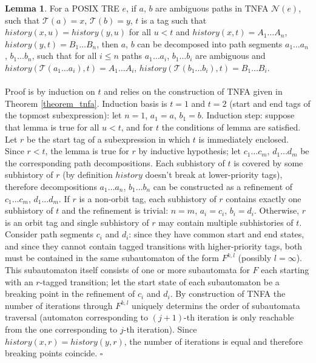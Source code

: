 \documentclass{article}
\newcommand{\Xeq}{\!=\!}
\newcommand{\XN}{\mathcal{N}}
\newcommand{\XT}{\mathcal{T}}
\theoremstyle{definition}
\newtheorem{XLem}{Lemma}
\begin{document}
\begin{multicols}{2}
\begin{XLem}\label{lemma_path_decomposition}
For a POSIX TRE $e$,
if $a$, $b$ are ambiguous paths in TNFA $\XN(e)$, such that $\XT(a) \Xeq x$, $\XT(b) \Xeq y$,
$t$ is a tag such that $history(x, u) \Xeq history(y, u)$ for all $u \!<\! t$
and $history(x, t) \Xeq A_1 \dots A_n$, $history(y, t) \Xeq B_1 \dots B_n$,
then $a$, $b$ can be decomposed into path segments $a_1 \dots a_n$, $b_1 \dots b_n$,
such that for all $i \!\leq\! n$ paths $a_1 \dots a_i$, $b_1 \dots b_i$ are ambiguous
and $history(\XT(a_1 \dots a_i), t) \Xeq A_1 \dots A_i$, $history(\XT(b_1 \dots b_i), t) \Xeq B_1 \dots B_i$.
\\
\\
Proof is by induction on $t$ and relies on the construction of TNFA given in Theorem \ref{theorem_tnfa}.
Induction basis is $t \Xeq 1$ and $t \Xeq 2$ (start and end tags of the topmost subexpression): let $n \Xeq 1$, $a_1 \Xeq a$, $b_1 \Xeq b$.
Induction step: suppose that lemma is true for all $u \!<\! t$,
and for $t$ the conditions of lemma are satisfied.
Let $r$ be the start tag of a subexpression in which $t$ is immediately enclosed.
Since $r \!<\! t$, the lemma is true for $r$ by inductive hypothesis;
let $c_1 \dots c_m$, $d_1 \dots d_m$ be the corresponding path decompositions.
Each subhistory of $t$ is covered by some subhistory of $r$ (by definition $history$ doesn't break at lower-priority tags),
therefore decompositions $a_1 \dots a_n$, $b_1 \dots b_n$ can be constructed as a refinement of $c_1 \dots c_m$, $d_1 \dots d_m$.
If $r$ is a non-orbit tag, each subhistory of $r$ contains exactly one subhistory of $t$
and the refinement is trivial: $n \Xeq m$, $a_i \Xeq c_i$, $b_i \Xeq d_i$.
Otherwise, $r$ is an orbit tag and single subhistory of $r$ may contain multiple subhistories of $t$.
Consider path segments $c_i$ and $d_i$:
since they have common start and end states, and since they cannot contain tagged transitions with higher-priority tags,
both must be contained in the same subautomaton of the form $F^{k,l}$ (possibly $l \Xeq \infty$).
This subautomaton itself consists of one or more subautomata for $F$ each starting with an $r$-tagged transition;
let the start state of each subautomaton be a breaking point in the refinement of $c_i$ and $d_i$.
By construction of TNFA the number of iterations through $F^{k,l}$ uniquely determins the order of subautomata traversal
(automaton corresponding to $(j \!+\! 1)$-th iteration is only reachable from the one corresponding to $j$-th iteration).
Since $history(x, r) \Xeq history(y, r)$, the number of iterations is equal and
therefore breaking points coincide.
$\square$
\end{XLem}


\end{multicols}
\end{document}
